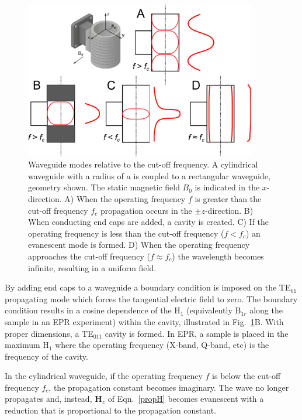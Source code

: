 \begin{figure}[ht]
 \centering
 \includegraphics[width=0.9\textwidth]{Kapitel/Ch2-Images/Ch2-UniformFieldWaveguide.eps}
 \caption[Waveguide modes relative to the cut-off frequency]{Waveguide modes relative to the cut-off frequency. A cylindrical waveguide with a radius of $a$ is coupled to a rectangular waveguide, geometry shown. The static magnetic field $B_0$ is indicated in the $x$-direction. A) When the operating frequency $f$ is greater than the cut-off frequency $f_c$ propagation occurs in the $\pm z$-direction. B) When conducting end caps are added, a cavity is created. C) If the operating frequency is less than the cut-off frequency ($f < f_c$) an evanescent mode is formed. D) When the operating frequency approaches the cut-off frequency ($f \approx f_c$) the wavelength becomes infinite, resulting in a uniform field. }
 \label{fig:UFwaveguide}
\end{figure}

By adding end caps to a waveguide a boundary condition is imposed on the TE$_{01}$ propagating mode which forces the tangential electric field to zero. The boundary condition results in a cosine dependence of the H$_1$ (equivalently B$_{1r}$ along the sample in an EPR experiment) within the cavity, illustrated in Fig.~\ref{fig:UFwaveguide}B. With proper dimensions, a TE$_{011}$ cavity is formed. In EPR, a sample is placed in the maximum H$_1$ where the operating frequency (X-band, Q-band, etc) is the frequency of the cavity. 

In the cylindrical waveguide, if the operating frequency $f$ is below the cut-off frequency $f_c$, the propagation constant becomes imaginary. The wave no longer propagates and, instead, $\mathbf{H}_z$ of Eqn.~\ref{propH} becomes evanescent with a reduction that is proportional to the propagation constant. 

